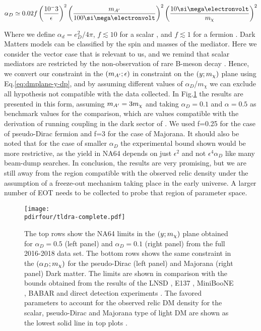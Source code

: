 \begin{equation}
  \label{eq:ad-freeze-out}
  \alpha_D \simeq 0.02 f\left(\frac{10^-3}{\epsilon}\right)^2\left(\frac{m_{\DM}}{100 \mev}\right)^2\left(\frac{10 \mev}{m_{\chi}}\right)^2
\end{equation}

Where we define $\alpha_d = e^2_D/4\pi$, $f\lesssim 10$ for a scalar \cite{deNiverville:2011it}, and $f\lesssim 1$ for a fermion \cite{PhysRevD.91.094026}. Dark Matters models can be classified by the spin and masses of the mediator. Here we consider the vector case that is relevant to us, and we remind that scalar mediators are restricted by the non-observation of rare B-meson decay \cite{battaglieri2017cosmic}. Hence, we convert our constraint in the $(m_{A'};\epsilon)$ in constraint on the $(y;m_{\chi})$ plane using Eq.\ref{eq:dmplane-y-dp}, and by assuming different values of $\alpha_D$/$m_{\chi}$ we can exclude all hypothesis not compatible with the data collected. In Fig.\ref{fig:dm-alpha-excl} the results are presented in this form, assuming $m_{A'} = 3m_{\chi}$ and taking $\alpha_D=0.1$ and $\alpha=0.5$ as benchmark values for the comparison, which are values compatible with the derivation of running coupling in the dark sector of \cite{Davoudiasl:2015hxa}. We used f=0.25 for the case of pseudo-Dirac fermion and f=3 for the case of Majorana. It should also be noted that for the case of smaller $\alpha_D$ the experimental bound shown would be more restrictive, as the yield in NA64 depends on just $\epsilon^2$ and not $\epsilon^4 \alpha_D$ like many beam-dump searches. In conclusion, the results are very promising, but we are still away from the region compatible with the observed relic density under the assumption of a freeze-out mechanism taking place in the early universe. A larger number of EOT needs to be collected to probe that region of parameter space.

\begin{figure}[bth!]
  \centering
  \texttt{[image: \\pdirfour/tldra-complete.pdf]}
  \caption[Exclusion limit in the $dmyplane$ for scalr, pseudo-Dirac and Majorana type of light Dark Matter]{The top rows show the NA64 limits in the $(y;m_{\chi})$ plane obtained for $\alpha_D = 0.5$ (left panel) and $\alpha_D = 0.1$ (right panel) from the full 2016-2018 data set. The bottom rows shows the same constraint in the $(\alpha_D;m_{\chi})$ for the pseudo-Dirac (left panel) and Majorana (right panel) Dark matter. The limits are shown in comparison with the bounds obtained from the results of the LNSD \cite{deNiverville:2011it}, E137 \cite{e137}, MiniBooNE \cite{Aguilar-Arevalo:2018wea}, BABAR \cite{babar1} and direct detection experiments \cite{Essig:2012yx}. The favored parameters to account for the observed relic DM density for the scalar, pseudo-Dirac and Majorana type of light DM are shown as the lowest solid line in top plots \cite{Berlin:2018bsc}.}
  \label{fig:dm-alpha-excl}
\end{figure}
